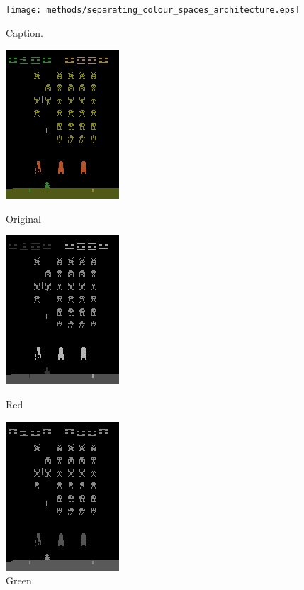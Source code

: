 \begin{figure}[h!]
\centering
\captionsetup{justification=centering}
\texttt{[image: methods/separating\_colour\_spaces\_architecture.eps]}
\caption{Caption.}
\label{fig:separating_colour_spaces_architecture}
\end{figure}

\begin{figure}[h!]
\centering
\captionsetup{justification=centering}
\begin{multicols}{4}
    \includegraphics[scale=0.7]{figures/methods/separating_colour_spaces_original.png}
    \caption{Original}\par
    \includegraphics[scale=0.7]{figures/methods/separating_colour_spaces_r.png}
    \caption{Red}\par
    \includegraphics[scale=0.7]{figures/methods/separating_colour_spaces_g.png}
    \caption{Green}\par

\end{multicols}
\end{figure}
